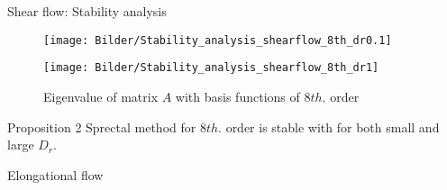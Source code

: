 \begin{frame}{Shear flow: Stability analysis}
	\begin{figure}
		\centering
		\begin{minipage}{0.4\linewidth}
			\texttt{[image: Bilder/Stability\_analysis\_shearflow\_8th\_dr0.1]}
		\end{minipage}
		\hspace{1cm}
		\begin{minipage}{0.4\linewidth}
			\centering
			\texttt{[image: Bilder/Stability\_analysis\_shearflow\_8th\_dr1]}
		\end{minipage}
		\caption{Eigenvalue of matrix $A$ with basis functions of $8th.$ order}
	\end{figure}
	
	\begin{block}{Proposition 2}
		Sprectal method for $8th.$ order is stable with for both small and large $D_r$.
	\end{block}
\end{frame}


\begin{frame}
	\centering
	Elongational flow
\end{frame}


